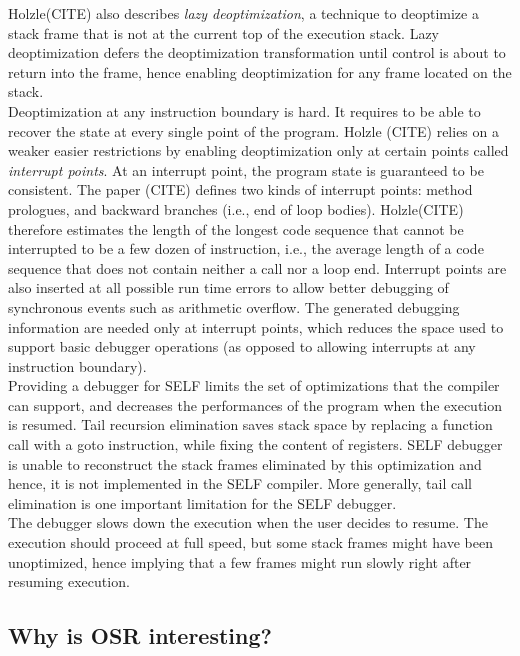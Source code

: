 Holzle(CITE) also describes \textit{lazy deoptimization}, a technique to deoptimize a stack frame that is not at the current top of the execution stack. 
Lazy deoptimization defers the deoptimization transformation until control is about to return into the frame, hence enabling deoptimization for any frame located on the stack.\\

Deoptimization at any instruction boundary is hard. 
It requires to be able to recover the state at every single point of the program.
Holzle (CITE) relies on a weaker easier restrictions by enabling deoptimization only at certain points called \textit{interrupt points}. 
At an interrupt point, the program state is guaranteed to be consistent. 
The paper (CITE) defines two kinds of interrupt points: method prologues, and backward branches (i.e., end of loop bodies).
Holzle(CITE) therefore estimates the length of the longest code sequence that cannot be interrupted to be a few dozen of instruction, i.e., the average length of a code sequence that does not contain neither a call nor a loop end.
Interrupt points are also inserted at all possible run time errors to allow better debugging of synchronous events such as arithmetic overflow. 
The generated debugging information are needed only at interrupt points, which reduces the space used to support basic debugger operations (as opposed to allowing interrupts at any instruction boundary).\\

Providing a debugger for SELF limits the set of optimizations that the compiler can support, and decreases the performances of the program when the execution is resumed. 
Tail recursion elimination saves stack space by replacing a function call with a goto instruction, while fixing the content of registers.
SELF debugger is unable to reconstruct the stack frames eliminated by this optimization and hence, it is not implemented in the SELF compiler.
More generally, tail call elimination is one important limitation for the SELF debugger.\\
The debugger slows down the execution when the user decides to resume. 
The execution should proceed at full speed, but some stack frames might have been unoptimized, hence implying that a few frames might run slowly right after resuming execution.\\

\subsection{Why is OSR interesting?}


